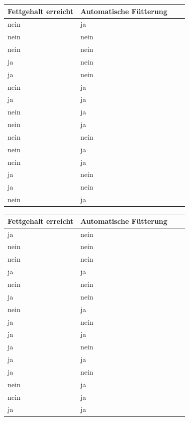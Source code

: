 \documentclass[a4paper, 9pt]{scrartcl}\usepackage[]{graphicx}\usepackage[]{xcolor}
\begin{document}
\begin{center}
\begin{minipage}[t]{0.45\textwidth}
\small
\begin{center}

\begin{tabular}{p{2.5cm}p{2.5cm}p{2.5cm}p{2.5cm}}
\toprule
Fettgehalt erreicht & Automatische Fütterung\\
\midrule
nein & ja\\
nein & nein\\
nein & nein\\
ja & nein\\
ja & nein\\
\addlinespace
nein & ja\\
ja & ja\\
nein & ja\\
nein & ja\\
nein & nein\\
\addlinespace
nein & ja\\
nein & ja\\
ja & nein\\
ja & nein\\
nein & ja\\
\bottomrule
\end{tabular}


\end{center}
\end{minipage}
\begin{minipage}[t]{0.45\textwidth}
\small
\begin{center}

\begin{tabular}{p{2.5cm}p{2.5cm}p{2.5cm}p{2.5cm}}
\toprule
Fettgehalt erreicht & Automatische Fütterung\\
\midrule
ja & nein\\
nein & nein\\
nein & nein\\
ja & ja\\
nein & nein\\
\addlinespace
ja & nein\\
nein & ja\\
ja & nein\\
ja & ja\\
ja & nein\\
\addlinespace
ja & ja\\
ja & nein\\
nein & ja\\
nein & ja\\
ja & ja\\
\bottomrule
\end{tabular}


\end{center}
\end{minipage}
\end{center}
\end{document}
